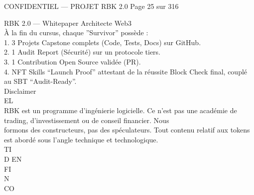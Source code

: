 \vspace{0.5em}
\vspace{0.5em}
\vspace{0.5em}
\vspace{0.5em}
\begin{confidential}CONFIDENTIEL — PROJET RBK 2.0                                            Page 25 sur 316\end{confidential}
RBK 2.0 — Whitepaper Architecte Web3\\
\vspace{0.5em}
\vspace{0.5em}
\vspace{0.5em}
À la fin du cursus, chaque ”Survivor” possède :\\
\vspace{0.5em}
1. 3 Projets Capstone complets (Code, Tests, Docs) sur GitHub.\\
\vspace{0.5em}
2. 1 Audit Report (Sécurité) sur un protocole tiers.\\
\vspace{0.5em}
3. 1 Contribution Open Source validée (PR).\\
\vspace{0.5em}
4. NFT Skills “Launch Proof” attestant de la réussite Block Check final, couplé au SBT “Audit-Ready”.\\
\vspace{0.5em}
Disclaimer\\
\vspace{0.5em}
\vspace{0.5em}
\vspace{0.5em}
\vspace{0.5em}
EL\\
RBK est un programme d’ingénierie logicielle. Ce n’est pas une académie de trading, d’investissement ou de conseil financier. Nous\\
formons des constructeurs, pas des spéculateurs. Tout contenu relatif aux tokens est abordé sous l’angle technique et technologique.\\
\vspace{0.5em}
\vspace{0.5em}
\vspace{0.5em}
\vspace{0.5em}
TI\\
D   EN\\
FI\\
N\\
CO\\
\vspace{0.5em}
